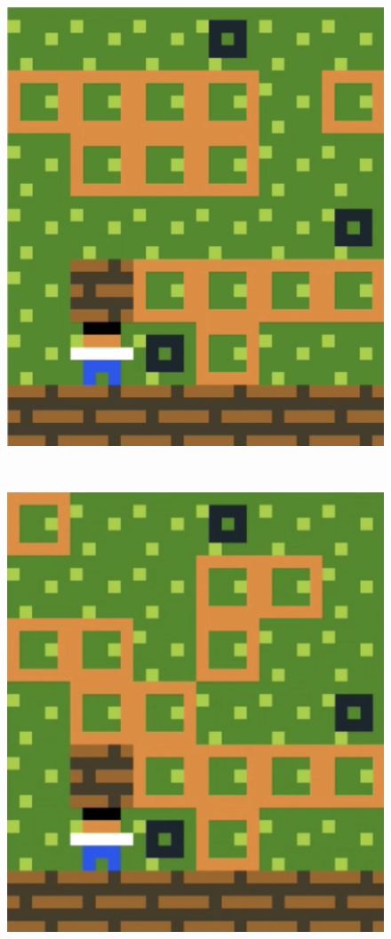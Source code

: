 \begin{figure}[!htbp]
\begin{minipage}[t]{0.2\textwidth}
\end{minipage}
$\:$
\begin{minipage}[t]{0.2\textwidth}
\includegraphics[width=\textwidth]{figures/finaldesign7_1.png} \hfill \\
\end{minipage}
$\:$
\begin{minipage}[t]{0.2\textwidth}
\includegraphics[width=\textwidth]{figures/finaldesign7_2.png} \hfill \\

\end{minipage}
\end{figure}
